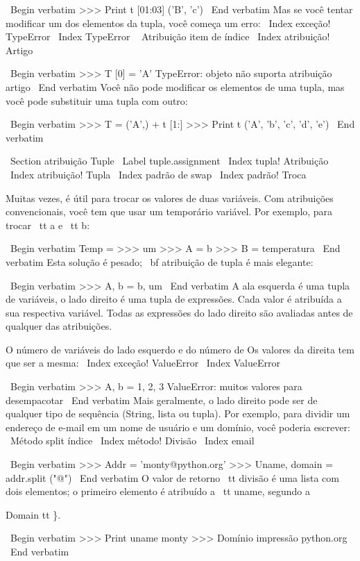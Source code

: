 \documentclass[10pt]{book}
\begin{document}
\begin {itemize}
{{{{{{{\ Begin {verbatim}
>>> Print t [01:03]
('B', 'c')
\ End {verbatim}
%
Mas se você tentar modificar um dos elementos da tupla, você começa
um erro:
\ Index {exceção! TypeError}
\ Index {} TypeError
\ {} Atribuição item de índice
\ Index {atribuição! Artigo}

\ Begin {verbatim}
>>> T [0] = 'A'
TypeError: objeto não suporta atribuição artigo
\ End {verbatim}
%
Você não pode modificar os elementos de uma tupla, mas você pode substituir
uma tupla com outro:

\ Begin {verbatim}
>>> T = ('A',) + t [1:]
>>> Print t
('A', 'b', 'c', 'd', 'e')
\ End {verbatim}
%

\ Section {atribuição Tuple}
\ Label {} tuple.assignment
\ Index {tupla! Atribuição}
\ Index {atribuição! Tupla}
\ Index {padrão de swap}
\ Index {padrão! Troca}

Muitas vezes, é útil para trocar os valores de duas variáveis.
Com atribuições convencionais, você tem que usar um temporário
variável. Por exemplo, para trocar {\ tt a} e {\ tt b}:

\ Begin {verbatim}
Temp = >>> um
>>> A = b
>>> B = temperatura
\ End {verbatim}
%
Esta solução é pesado; {\ bf atribuição de tupla} é mais elegante:

\ Begin {verbatim}
>>> A, b = b, um
\ End {verbatim}
%
A ala esquerda é uma tupla de variáveis, o lado direito é uma tupla de
expressões. Cada valor é atribuída a sua respectiva variável.  
Todas as expressões do lado direito são avaliadas antes de qualquer
das atribuições.

O número de variáveis ​​do lado esquerdo e do número de
Os valores da direita tem que ser a mesma:
\ Index {exceção! ValueError}
\ Index {} ValueError

\ Begin {verbatim}
>>> A, b = 1, 2, 3
ValueError: muitos valores para desempacotar
\ End {verbatim}
%
Mais geralmente, o lado direito pode ser de qualquer tipo de sequência
(String, lista ou tupla). Por exemplo, para dividir um endereço de e-mail
em um nome de usuário e um domínio, você poderia escrever:
\ {Método split} índice
\ Index {método! Divisão}
\ Index {email}

\ Begin {verbatim}
>>> Addr = 'monty@python.org'
>>> Uname, domain = addr.split ("@")
\ End {verbatim}
%
O valor de retorno {\ tt divisão} é uma lista com dois elementos;
o primeiro elemento é atribuído a {\ tt uname}, segundo a
{Domain tt \}.

\ Begin {verbatim}
>>> Print uname
monty
>>> Domínio impressão
python.org
\ End {verbatim}
%

}}}}}}}}
\end{itemize}
\end{document}
